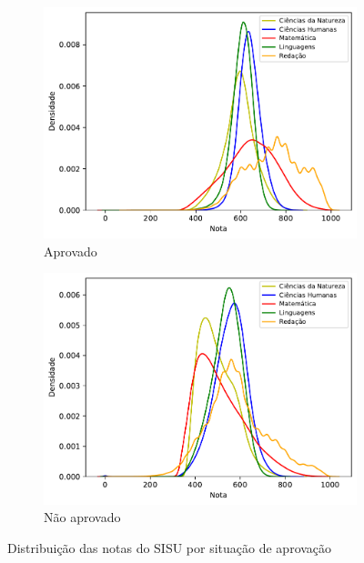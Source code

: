             \begin{figure}[h]
                \centering
            
                \begin{subfigure}{\textwidth}
                    \centering
                    \includegraphics[width=\linewidth]{figuras/distribuicao_notas_aprovados.pdf}
                    \caption{Aprovado}
                \end{subfigure}
                \hfill
                \begin{subfigure}{\textwidth}
                    \centering
                    \includegraphics[width=\linewidth]{figuras/distribuicao_notas_nao_aprovados.pdf}
                    \caption{Não aprovado}
                \end{subfigure}
            
                \caption{Distribuição das notas do SISU por situação de aprovação}
                \label{fig:nota-aprovacao}
            \end{figure}
    
